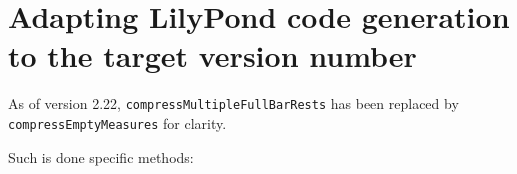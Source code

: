 \section{Adapting LilyPond code generation to the target version number}

As of version 2.22, {\tt compressMultipleFullBarRests} has been replaced by {\tt compressEmptyMeasures} for clarity.

Such is done specific methods:
\begin{lstlisting}[language=CPlusPlus]

\end{lstlisting}
